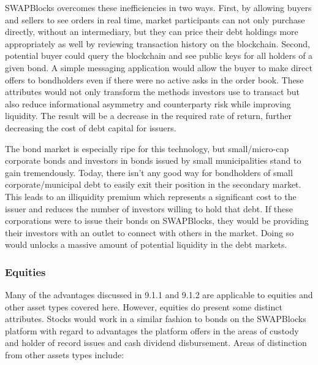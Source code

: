 \documentclass[12pt]{article}
\begin{document}
SWAPBlocks overcomes these inefficiencies in two ways. First, by allowing buyers and sellers to see orders in real time, 
market participants can not only purchase directly, without an intermediary, but they can price their debt holdings more 
appropriately as well by reviewing transaction history on the blockchain. Second, potential buyer could query the blockchain 
and see public keys for all holders of a given bond. 
A simple messaging application would allow the buyer to make direct offers to bondholders even if there were no active asks in 
the order book. These attributes would not only transform the methods investors use to transact but also reduce informational 
asymmetry and counterparty risk while improving liquidity. The result will be a decrease in the required rate of return, 
further decreasing the cost of debt capital for issuers.

The bond market is especially ripe for this technology, but small/micro-cap corporate bonds and investors in bonds issued by small
municipalities stand to gain 
tremendously. Today, there isn’t any good way for bondholders of small corporate/municipal debt to easily exit their position 
in the secondary market. This leads to an illiquidity premium which represents a significant cost to the issuer and 
reduces the number of investors willing to hold that debt. If these corporations were to issue their bonds on SWAPBlocks, 
they would be providing their investors with an outlet to connect with others in the market. Doing so would unlocks a 
massive amount of potential liquidity in the debt markets.

\subsubsection{Equities}
Many of the advantages discussed in 9.1.1 and 9.1.2 are applicable to equities and other asset types covered here. 
However, equities do present some distinct attributes. Stocks would work in a similar fashion to bonds on the SWAPBlocks 
platform with regard to advantages the platform offers in the areas of custody and holder of record issues and cash 
dividend disbursement. Areas of distinction from other assets types include:
\end{document}
